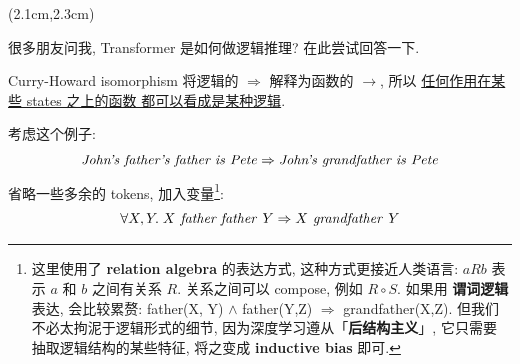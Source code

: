 \begin{preview}

\cc{
\title{\vspace{-1.5cm} \bfseries\color{blue}{\Large Transformer 的逻辑解释}}
}{
\title{\vspace{-1.5cm} \bfseries\color{blue}{\Large Transformer as Logic}}
}

\date{\vspace{-2cm}} %

\maketitle

\setcounter{section}{-1}

\begin{textblock*}{5cm}(2.1cm,2.3cm) %
{}
\end{textblock*}

\begin{minipage}{\textwidth}
\setlength{\parskip}{0.4\baselineskip}

很多朋友问我, Transformer 是如何做逻辑推理? 在此尝试回答一下.

Curry-Howard isomorphism 将逻辑的 $\Rightarrow$ 解释为函数的 $\rightarrow$, 所以 \uline{任何作用在某些 states 之上的函数 都可以看成是某种逻辑}.

考虑这个例子:
\begin{equation}
\text{\textit{John's father's father is Pete}} \Rightarrow \text{\textit{John's grandfather is Pete}}
\end{equation}
省略一些多余的 tokens, 加入变量\footnote{这里使用了 \textbf{relation algebra} 的表达方式, 这种方式更接近人类语言: $a R b$ 表示 $a$ 和 $b$ 之间有关系 $R$.  关系之间可以 compose, 例如 $R \circ S$.  如果用 \textbf{谓词逻辑} 表达, 会比较累赘: father(X, Y) $\wedge$ father(Y,Z) $\Rightarrow$ grandfather(X,Z).  但我们不必太拘泥于逻辑形式的细节, 因为深度学习遵从「\textbf{后结构主义}」, 它只需要 抽取逻辑结构的某些特征, 将之变成 \textbf{inductive bias} 即可.}:
\begin{equation}
\forall X, Y. \;  X \text{\textit{ father father }} Y \Rightarrow X \text{\textit{ grandfather }} Y
\end{equation}


\end{minipage}
\end{preview}
